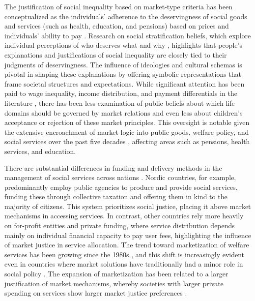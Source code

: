 \documentclass[
    behavsci,
    article,
    submit,
moreauthors
]{mdpi}
\begin{document}
The justification of social inequality based on market-type criteria has
been conceptualized as the individuals' adherence to the deservingness
of social goods and services (such as health, education, and pensions)
based on prices and individuals' ability to pay
\citep{boltanski_new_2005, lane_market_1986, streeck_citizens_2012}.
Research on social stratification beliefs, which explore individual
perceptions of who deserves what and why \citep{kluegel_beliefs_1987},
highlights that people's explanations and justifications of social
inequality are closely tied to their judgments of deservingness. The
influence of ideologies \citep{wegener_dominant_1995} and cultural
schemas \citep{homan_being_2017} is pivotal in shaping these
explanations by offering symbolic representations that frame societal
structures and expectations. While significant attention has been paid
to wage inequality, income distribution, and payment differentials in
the literature
\citep{castillo_legitimacy_2011, evans_family_2010, jasso_how_1999, shariff_income_2016},
there has been less examination of public beliefs about which life
domains should be governed by market relations
\citep{lindh_bringing_2023} and even less about children's acceptance or
rejection of these market principles. This oversight is notable given
the extensive encroachment of market logic into public goods, welfare
policy, and social services over the past five decades
\citep{centeno_arc_2012, harvey_breve_2015}, affecting areas such as
pensions, health services, and education.

There are substantial differences in funding and delivery methods in the
management of social services across nations
\citep{jensen_worlds_2008, stoy_worlds_2014}. Nordic countries, for
example, predominantly employ public agencies to produce and provide
social services, funding these through collective taxation and offering
them in kind to the majority of citizens. This system prioritizes social
justice, placing it above market mechanisms in accessing services. In
contrast, other countries rely more heavily on for-profit entities and
private funding, where service distribution depends mainly on individual
financial capacity to pay user fees, highlighting the influence of
market justice in service allocation. The trend toward marketization of
welfare services has been growing since the 1980s
\citep{salamon_marketization_1993}, and this shift is increasingly
evident even in countries where market solutions have traditionally had
a minor role in social policy \citep{sivesind_changing_2017}. The
expansion of marketization has been related to a larger justification of
market mechanisms, whereby societies with larger private spending on
services show larger market justice preferences
\citep{lindh_public_2015}.
\end{document}
